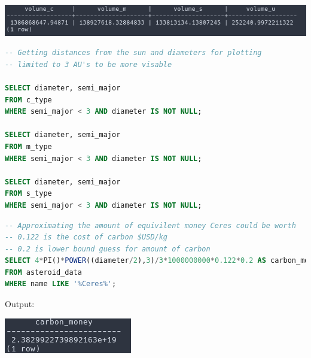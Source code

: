 \documentclass[12pt]{report}
\begin{document}
\includegraphics[scale=0.7]{"charts/q2.png"}

\begin{lstlisting}[language=sql, deletekeywords={IDENTITY},
	deletekeywords={[2]INT},
	morekeywords={clustered},
	framesep=8pt,
	xleftmargin=40pt,
	framexleftmargin=40pt,
	frame=tb,
	framerule=0pt]
-- Getting distances from the sun and diameters for plotting
-- limited to 3 AU's to be more visable

SELECT diameter, semi_major
FROM c_type
WHERE semi_major < 3 AND diameter IS NOT NULL;
	   
SELECT diameter, semi_major
FROM m_type
WHERE semi_major < 3 AND diameter IS NOT NULL;

SELECT diameter, semi_major
FROM s_type
WHERE semi_major < 3 AND diameter IS NOT NULL;
\end{lstlisting}

\newpage
\begin{lstlisting}[language=sql, deletekeywords={IDENTITY},
	deletekeywords={[2]INT},
	morekeywords={clustered},
	framesep=8pt,
	xleftmargin=40pt,
	framexleftmargin=40pt,
	frame=tb,
	framerule=0pt]
-- Approximating the amount of equivilent money Ceres could be worth
-- 0.122 is the cost of carbon $USD/kg
-- 0.2 is lower bound guess for amount of carbon
SELECT 4*PI()*POWER((diameter/2),3)/3*1000000000*0.122*0.2 AS carbon_money
FROM asteroid_data
WHERE name LIKE '%Ceres%';
\end{lstlisting}

Output:

\includegraphics{"charts/q3.png"}
\newpage

\printbibliography

\end{document}
